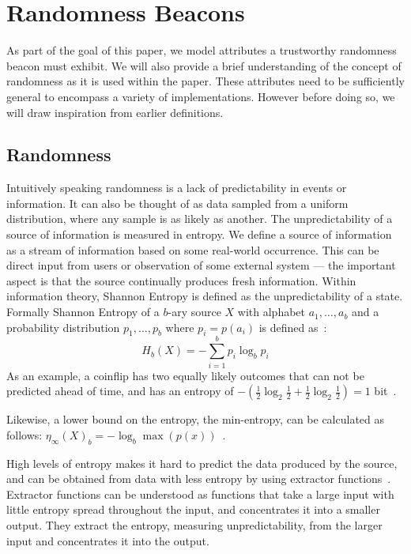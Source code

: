 \section{Randomness Beacons}\label{sec:beacons}

As part of the goal of this paper, we model attributes a trustworthy randomness beacon must exhibit.
We will also provide a brief understanding of the concept of randomness as it is used within the paper.
These attributes need to be sufficiently general to encompass a variety of implementations.
However before doing so, we will draw inspiration from earlier definitions.

\subsection{Randomness}\label{sub:beacons_randomness}

Intuitively speaking randomness is a lack of predictability in events or information. It can also be thought of as data sampled from a uniform distribution, where any sample is as likely as another. The unpredictability of a source of information is measured in entropy.
We define a source of information as a stream of information based on some real-world occurrence. This can be direct input from users or observation of some external system --- the important aspect is that the source continually  produces fresh information.
Within information theory, Shannon Entropy is defined as the unpredictability of a state.
Formally Shannon Entropy of a $b$-ary source $X$ with alphabet ${a_1, \ldots, a_b}$ and a probability distribution ${p_1, \ldots , p_b}$ where $p_i = p(a_i)$ is defined as~\cite{informationtheory}:
$$
H_{b} (X) = -\sum\limits_{i = 1}^b p_{i}\log_{b} p_{i}
$$
As an example, a coinflip has two equally likely outcomes that can not be predicted ahead of time, and has an entropy of $-(\frac{1}{2}\log_2 \frac{1}{2} + \frac{1}{2}\log_2 \frac{1}{2}) = 1$ bit~\cite{informationtheory}.

Likewise, a lower bound on the entropy, the  min-entropy, can be calculated as follows: $\eta _\infty(X) _{b} = -\log_{b}\max(p(x))$~\cite{informationtheory}.

High levels of entropy makes it hard to predict the data produced by the source, and can be obtained from data with less entropy by using extractor functions~\cite{pseudorandomness}. Extractor functions can be understood as functions that take a large input with little entropy spread throughout the input, and concentrates it into a smaller output. They extract the entropy, measuring unpredictability, from the larger input and concentrates it into the output.

